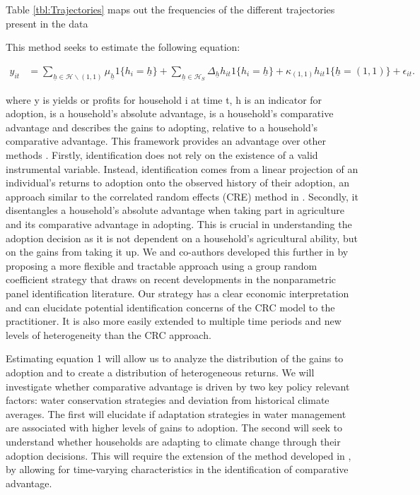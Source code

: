\documentclass{article}
\begin{document}
Table \ref{tbl:Trajectories} maps out the frequencies of the different trajectories present in the data



This method seeks to estimate the following equation:

\begin{align}
y_{it}&=\sum_{\underline{h}\in\mathcal{H}\backslash (1,1)}\mu_{\underline{h}}1\{h_{i}=\underline{h}\}+\sum_{\underline{h}\in\mathcal{H}_{S}}\Delta_{\underline{h}}h_{it}1\{h_{i}=\underline{h}\}+\kappa_{(1,1)}h_{it}1\{\underline{h}=(1,1)\}+\epsilon_{it}.\label{eq:GRC}
\end{align}

where y is yields or profits for household i at time t, h is an indicator for adoption,  is a household’s absolute advantage,  is a household’s comparative advantage and  describes the gains to adopting, relative to a household’s comparative advantage. This framework provides an advantage over other methods \citep{Wooldridge1997-xj,Heckman1998-pt}. Firstly, identification does not rely on the existence of a valid instrumental variable. Instead, identification comes from a linear projection of an individual's returns to adoption onto the observed history of their adoption, an approach similar to the correlated random effects (CRE) method in \citep{Chamberlain1984-uk}. Secondly, it disentangles a household’s absolute advantage when taking part in agriculture and its comparative advantage in adopting. This is crucial in understanding the adoption decision as it is not dependent on a household’s agricultural ability, but on the gains from taking it up. We and co-authors developed this further in \citep{Tjernstrom_Emilia_Dalia_Ghanem_Oscar_Barriga_Cabanillas_Travis_J_Lybbert_Jeffrey_D_Michler_and_Aleksandr_Michuda2020-bc} by proposing a more flexible and tractable approach using a group random coefficient strategy that draws on recent developments in the nonparametric panel identification literature. Our strategy has a clear economic interpretation and can elucidate potential identification concerns of the CRC model to the practitioner. It is also more easily extended to multiple time periods and new levels of heterogeneity than the CRC approach.

Estimating equation 1 will allow us  to analyze the distribution of the gains to adoption and to create a distribution of heterogeneous returns. We will investigate whether comparative advantage is driven by two key policy relevant factors: water conservation strategies and deviation from historical climate averages. The first will elucidate if adaptation strategies in water management are associated with higher levels of gains to adoption. The second will seek to understand whether households are adapting to climate change through their adoption decisions. This will require the extension of the method developed in \citep{Tjernstrom_Emilia_Dalia_Ghanem_Oscar_Barriga_Cabanillas_Travis_J_Lybbert_Jeffrey_D_Michler_and_Aleksandr_Michuda2020-bc}, by allowing for time-varying characteristics in the identification of comparative advantage.
\end{document}
